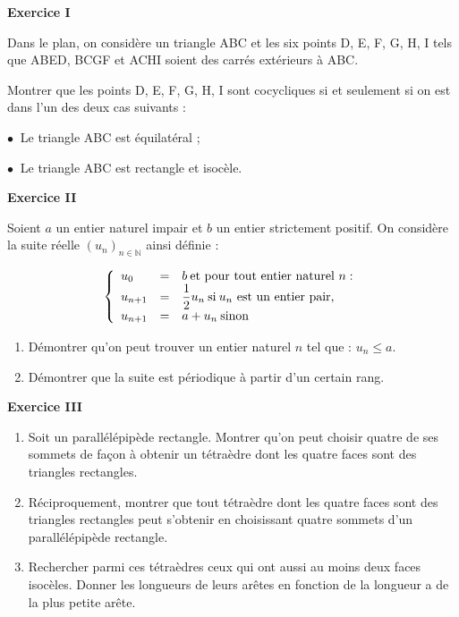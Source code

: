 \documentclass[a4paper,11pt]{article}
\newcommand{\N}{\mathbb{N}}
\begin{document}
\begin{center}\textbf{{\color{blue} Exercice I}}
\end{center}

Dans le plan, on considère un triangle ABC et les six points D, E, F,
G, H, I tels que ABED, BCGF et ACHI soient des carrés extérieurs à ABC.

Montrer que les points D, E, F, G, H, I sont cocycliques si et seulement si on est dans
l'un des deux cas suivants :

\hskip 20mm $\bullet\ $ Le triangle ABC est équilatéral ;

\hskip 20mm $\bullet\ $ Le triangle ABC est rectangle et isocèle.

\begin{center}\textbf{{\color{blue} Exercice II}}
\end{center}

Soient $a$  un entier naturel impair et $b$ un entier strictement positif.
On considère la suite réelle $\left(u_n\right)_{n\in\N}$ ainsi définie :

\[\left\{\begin{array}{l c l}
u_0 &=& b \:\text{et pour tout entier naturel } n :\\
u_{n+1}&=& \dfrac12 u_n\: \text{si}\: u_n\ \text{est un entier pair,}\\
u_{n+1}&=&a + u_n\: \text{sinon}
\end{array}\right.\]

\medskip

\begin{enumerate}
\item Démontrer qu'on peut trouver un entier naturel $n$ tel que : $u_n\leqslant a$.
\item Démontrer que la suite est périodique à partir d'un certain rang.
\end{enumerate}

\vskip 3mm

\begin{center}\textbf{{\color{blue} Exercice III}}
\end{center}

\medskip

\begin{enumerate}
\item Soit un parallélépipède rectangle. Montrer qu'on peut choisir
quatre de ses sommets de façon à obtenir un tétraèdre dont les quatre faces sont
des triangles rectangles.
\item Réciproquement, montrer que tout tétraèdre dont les quatre faces sont des
triangles rectangles peut s'obtenir en choisissant quatre sommets d'un parallélépipède
rectangle.
\item Rechercher  parmi ces tétraèdres ceux qui ont aussi au moins deux faces isocèles.
Donner les longueurs de leurs arêtes en fonction de la longueur a de la plus petite arête.
\end{enumerate}
\end{document}
